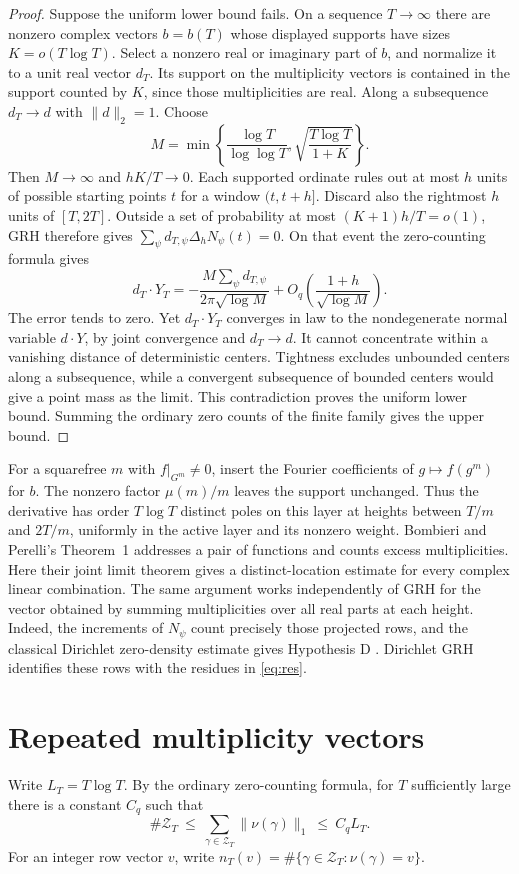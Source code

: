 \documentclass[11pt]{article}
\begin{document}
\begin{proof}
Suppose the uniform lower bound fails. On a sequence \(T\to\infty\)
there are nonzero complex vectors \(b=b(T)\) whose displayed supports
have sizes \(K=o(T\log T)\). Select a nonzero real or imaginary part
of \(b\), and normalize it to a unit real vector \(d_T\). Its support
on the multiplicity vectors is contained in the support counted by
\(K\), since those multiplicities are real. Along a subsequence
\(d_T\to d\) with \(\|d\|_2=1\). Choose
\[
 M=\min\left\{\frac{\log T}{\log\log T},
                 \sqrt{\frac{T\log T}{1+K}}\right\}.
\]
Then \(M\to\infty\) and \(hK/T\to0\). Each supported ordinate
rules out at most \(h\) units of possible starting points \(t\) for a
window \((t,t+h]\). Discard also the rightmost \(h\) units of
\([T,2T]\). Outside a set of probability at most
\((K+1)h/T=o(1)\), GRH therefore gives
\(\sum_\psi d_{T,\psi}\Delta_hN_\psi(t)=0\).
On that event the zero-counting formula gives
\[
  d_T\cdot Y_T
    =-\frac{M\sum_\psi d_{T,\psi}}{2\pi\sqrt{\log M}}
      +O_q\!\left(\frac{1+h}{\sqrt{\log M}}\right).
\]
The error tends to zero. Yet \(d_T\cdot Y_T\) converges in law to
the nondegenerate normal variable \(d\cdot Y\), by joint convergence
and \(d_T\to d\). It cannot concentrate within a vanishing distance
of deterministic centers. Tightness excludes unbounded centers along
a subsequence, while a convergent subsequence of bounded centers
would give a point mass as the limit. This contradiction proves the
uniform lower bound. Summing the ordinary zero counts of the finite
family gives the upper bound.
\end{proof}

For a squarefree $m$ with $f|_{G^m}\ne0$, insert the Fourier coefficients of
\(g\mapsto f(g^m)\) for \(b\). The nonzero factor \(\mu(m)/m\) leaves
the support unchanged. Thus the derivative has order \(T\log T\)
distinct poles on this layer at heights between \(T/m\) and
\(2T/m\), uniformly in the active layer and its nonzero weight.
Bombieri and Perelli's Theorem~1 addresses a pair of functions and
counts excess multiplicities. Here their joint limit theorem gives a distinct-location estimate for every complex linear combination. The same argument works independently of GRH for the vector obtained by summing multiplicities over all real parts at each height. Indeed, the increments of $N_\psi$ count precisely those projected rows, and the classical Dirichlet zero-density estimate gives Hypothesis D \cite[p.~273]{BP}. Dirichlet GRH identifies these rows with the residues in \eqref{eq:res}.


\section{Repeated multiplicity vectors}
Write $L_T=T\log T$. By the ordinary zero-counting formula, for $T$ sufficiently large there is a constant $C_q$ such that
\begin{equation}\label{eq:budget}
 \#\mathcal Z_T\ \le\ \sum_{\gamma\in\mathcal Z_T}\|\nu(\gamma)\|_1\ \le\ C_q L_T.
\end{equation}
For an integer row vector $v$, write $n_T(v)=\#\{\gamma\in\mathcal Z_T:\nu(\gamma)=v\}$.
\end{document}
